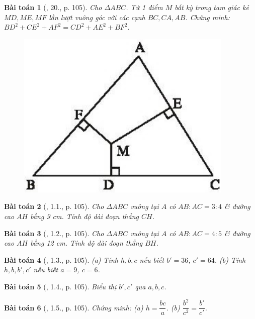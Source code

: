 \documentclass{article}
\newtheorem{baitoan}{Bài toán}
\begin{document}
\begin{baitoan}[\cite{SBT_Toan_9_tap_1}, 20., p. 105]
	Cho $\Delta ABC$. Từ 1 điểm $M$ bất kỳ trong tam giác kẻ $MD,ME,MF$ lần lượt vuông góc với các cạnh $BC,CA,AB$. Chứng minh: $BD^2 + CE^2 + AF^2 = CD^2 + AE^2 + BF^2$.
	\begin{figure}[H]
		\centering
		\includegraphics[scale=.25]{SBT_Toan_9_8_p105}
	\end{figure}
\end{baitoan}

\begin{baitoan}[\cite{SBT_Toan_9_tap_1}, 1.1., p. 105]
	Cho $\Delta ABC$ vuông tại $A$ có $AB:AC = 3:4$ \& đường cao $AH$ bằng {\rm9 cm}. Tính độ dài đoạn thẳng $CH$.
\end{baitoan}

\begin{baitoan}[\cite{SBT_Toan_9_tap_1}, 1.2., p. 105]
	Cho $\Delta ABC$ vuông tại $A$ có $AB:AC = 4:5$ \& đường cao $AH$ bằng {\rm12 cm}. Tính độ dài đoạn thẳng $BH$.
\end{baitoan}

\begin{baitoan}[\cite{SBT_Toan_9_tap_1}, 1.3., p. 105]
	(a) Tính $h,b,c$ nếu biết $b' = 36$, $c' = 64$. (b) Tính $h,b,b',c'$ nếu biết $a = 9$, $c = 6$.
\end{baitoan}

\begin{baitoan}[\cite{SBT_Toan_9_tap_1}, 1.4., p. 105]
	Biểu thị $b',c'$ qua $a,b,c$.
\end{baitoan}

\begin{baitoan}[\cite{SBT_Toan_9_tap_1}, 1.5., p. 105]
	Chứng minh: (a) $h = \dfrac{bc}{a}$. (b) $\dfrac{b^2}{c^2} = \dfrac{b'}{c'}$.
\end{baitoan}
\end{document}
